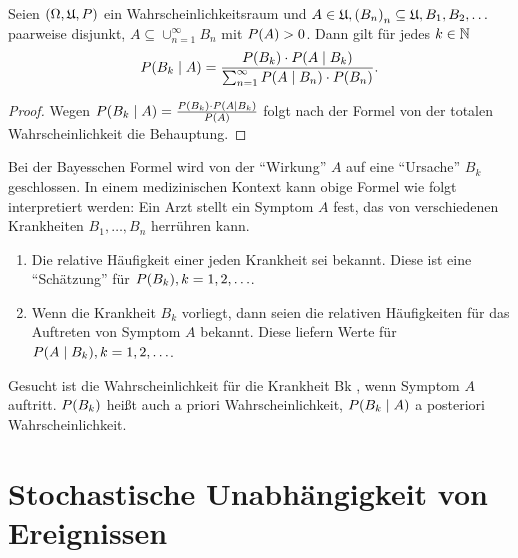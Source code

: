 \documentclass{lecture}
\begin{document}
    \begin{lemma}
        Seien \(\parentheses*{\Omega, \mathfrak{U}, P}\) ein Wahrscheinlichkeitsraum und \(A \in \mathfrak{U}, \parentheses*{B_n}_n \subseteq \mathfrak{U}, B_1, B_2, \ldots\) paarweise disjunkt, \(A \subseteq \cup_{n = 1}^\infty B_n\) mit \(P\parentheses*{A} > 0\).
        Dann gilt für jedes \(k \in \N\)
        \[
            P\parentheses*{B_k \mid A} = \frac{P\parentheses*{B_k} \cdot P\parentheses*{A \mid B_k}}{\sum_{n = 1}^\infty P\parentheses*{A \mid B_n} \cdot P\parentheses*{B_n}}.
        \]
    \end{lemma}

    \begin{proof}
        Wegen \(P\parentheses*{B_k \mid A} = \frac{P\parentheses*{B_k} \cdot P\parentheses*{A \mid B_k}}{P\parentheses*{A}}\) folgt nach der Formel von der totalen Wahrscheinlichkeit die Behauptung.
    \end{proof}

    Bei der Bayesschen Formel wird von der ``Wirkung'' \(A\) auf eine ``Ursache'' \(B_k\) geschlossen.
    In einem medizinischen Kontext kann obige Formel wie folgt interpretiert werden: Ein Arzt stellt ein Symptom \(A\) fest, das von verschiedenen Krankheiten \(B_1, \ldots, B_n\) herrühren kann.
    \begin{enumerate}[label=(\roman*)]
        \item Die relative Häufigkeit einer jeden Krankheit sei bekannt.
        Diese ist eine ``Schätzung'' für \(P\parentheses*{B_k}, k = 1, 2, \ldots\).
        \item Wenn die Krankheit \(B_k\) vorliegt, dann seien die relativen Häufigkeiten für das Auftreten von Symptom \(A\) bekannt.
        Diese liefern Werte für \(P\parentheses*{A \mid B_k}, k = 1, 2, \ldots\).
    \end{enumerate}
    Gesucht ist die Wahrscheinlichkeit für die Krankheit Bk , wenn Symptom \(A\) auftritt.
    \(P\parentheses*{B_k}\) heißt auch a priori Wahrscheinlichkeit, \(P\parentheses*{B_k \mid A}\) a posteriori Wahrscheinlichkeit.


    \section*{Stochastische Unabhängigkeit von Ereignissen}
\end{document}
